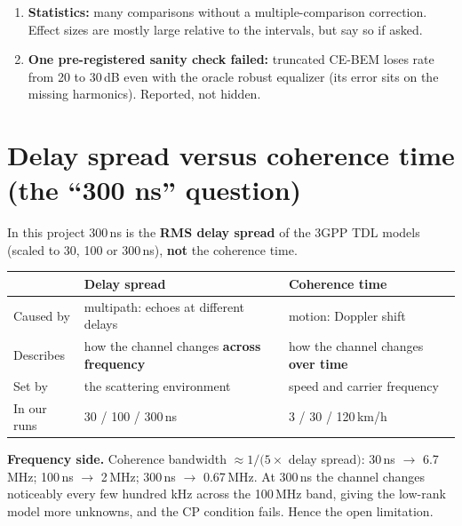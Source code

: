 \documentclass[11pt,a4paper]{article}
\begin{document}
\begin{enumerate}
TM-RIS with our receiver. TM is for security, harmonic steering or sensing, not single-user rate. An eavesdropper with
generic CE-BEM still gets 1.8--2.2\,bit/s/Hz, so the pattern must be kept secret.
\item \textbf{Statistics:} many comparisons without a multiple-comparison correction. Effect sizes are mostly large relative
to the intervals, but say so if asked.
\item \textbf{One pre-registered sanity check failed:} truncated CE-BEM loses rate from 20 to 30\,dB even with the oracle
robust equalizer (its error sits on the missing harmonics). Reported, not hidden.
\end{enumerate}

\section{Delay spread versus coherence time (the ``300 ns'' question)}
In this project 300\,ns is the \textbf{RMS delay spread} of the 3GPP TDL models (scaled to 30, 100 or 300\,ns), \textbf{not}
the coherence time.
\begin{center}\small
\begin{tabular}{lll}
\toprule
 & Delay spread & Coherence time\\
\midrule
Caused by & multipath: echoes at different delays & motion: Doppler shift\\
Describes & how the channel changes \textbf{across frequency} & how the channel changes \textbf{over time}\\
Set by & the scattering environment & speed and carrier frequency\\
In our runs & 30 / 100 / 300\,ns & 3 / 30 / 120\,km/h\\
\bottomrule
\end{tabular}
\end{center}
\textbf{Frequency side.} Coherence bandwidth $\approx 1/(5\times$ delay spread$)$: 30\,ns $\to$ 6.7\,MHz; 100\,ns $\to$
2\,MHz; 300\,ns $\to$ 0.67\,MHz. At 300\,ns the channel changes noticeably every few hundred kHz across the 100\,MHz band,
giving the low-rank model more unknowns, and the CP condition fails. Hence the open limitation.
\end{document}
